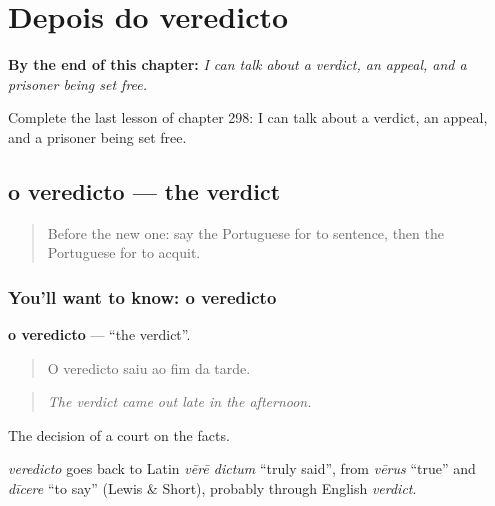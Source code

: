 
\chapter{Depois do veredicto}
\label{ch:pt-depois-do-veredicto}

\begin{chapteropening}
\textbf{By the end of this chapter:} \emph{I can talk about a verdict, an appeal, and a prisoner being set free.}

Complete the last lesson of chapter 298: I can talk about a verdict, an appeal, and a prisoner being set free.
\end{chapteropening}

\section[o veredicto]{o veredicto — the verdict}

\label{lesson:PT-C298-veredicto}



\begin{quote}
Before the new one: say the Portuguese for to sentence, then the Portuguese for to acquit.
\end{quote}

\subsection*{You'll want to know: o veredicto}
\textbf{o veredicto} — \textquotedblleft{}the verdict\textquotedblright{}.

\begin{quote}
O veredicto saiu ao fim da tarde.
\end{quote}

\begin{quote}
\emph{The verdict came out late in the afternoon.}
\end{quote}

The decision of a court on the facts.

\begin{cousinweb}
\emph{veredicto} goes back to Latin \emph{vērē dictum} \textquotedblleft{}truly said\textquotedblright{}, from \emph{vērus} \textquotedblleft{}true\textquotedblright{} and \emph{dīcere} \textquotedblleft{}to say\textquotedblright{} (Lewis \& Short), probably through English \emph{verdict}.
\end{cousinweb}

